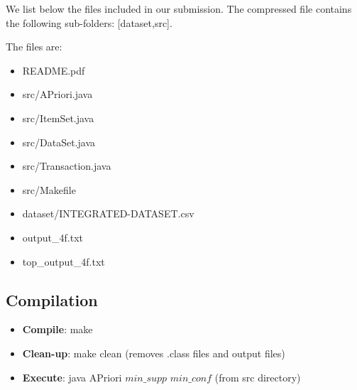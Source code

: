 \documentclass[11pt]{article}
\begin{document}
We list below the files included in our submission. The compressed file contains the following sub-folders: [dataset,src].

The files are:
\begin{itemize}
\item README.pdf
\item src/APriori.java
\item src/ItemSet.java
\item src/DataSet.java
\item src/Transaction.java
\item src/Makefile
\item dataset/INTEGRATED-DATASET.csv
\item output_4f.txt
\item top\_output\_4f.txt
\end{itemize}

\subsection* {Compilation}
\begin{itemize}
\item \textbf{Compile}: make
\item \textbf{Clean-up}: make clean (removes .class files and output files)
\item\textbf{Execute}: java APriori  $min\_supp$ $min\_conf$ (from src directory)

\end{itemize}
\end{document}
